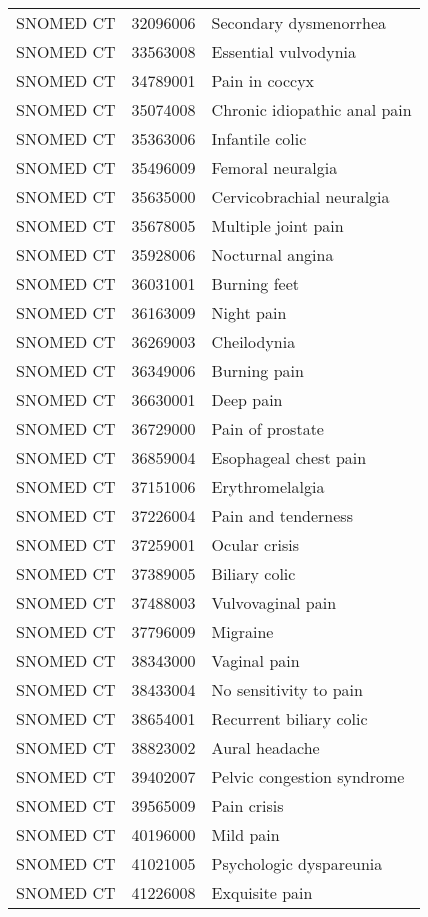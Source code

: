 \begin{longtable}{p{}p{}p{}}
  SNOMED CT & 32096006 & Secondary dysmenorrhea \\ 
  SNOMED CT & 33563008 & Essential vulvodynia \\ 
  SNOMED CT & 34789001 & Pain in coccyx \\ 
  SNOMED CT & 35074008 & Chronic idiopathic anal pain \\ 
  SNOMED CT & 35363006 & Infantile colic \\ 
  SNOMED CT & 35496009 & Femoral neuralgia \\ 
  SNOMED CT & 35635000 & Cervicobrachial neuralgia \\ 
  SNOMED CT & 35678005 & Multiple joint pain \\ 
  SNOMED CT & 35928006 & Nocturnal angina \\ 
  SNOMED CT & 36031001 & Burning feet \\ 
  SNOMED CT & 36163009 & Night pain \\ 
  SNOMED CT & 36269003 & Cheilodynia \\ 
  SNOMED CT & 36349006 & Burning pain \\ 
  SNOMED CT & 36630001 & Deep pain \\ 
  SNOMED CT & 36729000 & Pain of prostate \\ 
  SNOMED CT & 36859004 & Esophageal chest pain \\ 
  SNOMED CT & 37151006 & Erythromelalgia \\ 
  SNOMED CT & 37226004 & Pain and tenderness \\ 
  SNOMED CT & 37259001 & Ocular crisis \\ 
  SNOMED CT & 37389005 & Biliary colic \\ 
  SNOMED CT & 37488003 & Vulvovaginal pain \\ 
  SNOMED CT & 37796009 & Migraine \\ 
  SNOMED CT & 38343000 & Vaginal pain \\ 
  SNOMED CT & 38433004 & No sensitivity to pain \\ 
  SNOMED CT & 38654001 & Recurrent biliary colic \\ 
  SNOMED CT & 38823002 & Aural headache \\ 
  SNOMED CT & 39402007 & Pelvic congestion syndrome \\ 
  SNOMED CT & 39565009 & Pain crisis \\ 
  SNOMED CT & 40196000 & Mild pain \\ 
  SNOMED CT & 41021005 & Psychologic dyspareunia \\ 
  SNOMED CT & 41226008 & Exquisite pain \\ 

\end{longtable}
